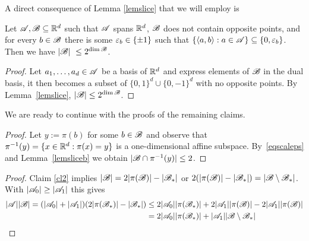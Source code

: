 \noindent A direct consequence of Lemma \ref{lemslice} that we will employ is

\begin{lemma}
    \label{lemsliceb}
    Let ${\mathscr{A}},{\mathscr{B}} \subseteq {\mathbb{R}}^d$ such that ${\mathscr{A}}$ spans ${\mathbb{R}}^d$, ${\mathscr{B}}$ does not contain opposite points, and for every $b \in {\mathscr{B}}$ there is some ${\varepsilon}_b \in \{ \pm 1\}$ such that $\{\langle a,b\rangle : a \in {\mathscr{A}}\} \subseteq \{0,{\varepsilon}_b\}$.
    Then we have $|\bb| \le 2^{\dim \bb}$.
\end{lemma}
\begin{proof}
    Let $a_1,\dots,a_d \in {\mathscr{A}}$ be a basis of ${\mathbb{R}}^d$ and express elements of ${\mathscr{B}}$ in the dual basis, it then becomes a subset of $\{0,1\}^d \cup \{0,-1\}^d$ with no opposite points. By Lemma~\ref{lemslice}, $|\bb| \le 2^{\dim \bb}$.
\end{proof}

We are ready to continue with the proofs of the remaining claims.

\claimpreimagespi*
\begin{proof}
    Let $y := \pi(b)$ for some $b \in {\mathscr{B}}$ and observe that $\pi^{-1}(y) = \{x \in {\mathbb{R}}^d : \pi(x) = y\}$ is a one-dimensional affine subspace.
    By~\eqref{eqscaleps} and Lemma~\ref{lemsliceb} we obtain $|{\mathscr{B}} \cap \pi^{-1}(y)| \le 2$.
\end{proof}

\ineqbasic*
\begin{proof}
    Claim \ref{cl2} implies $|{\mathscr{B}}| = 2|\pi({\mathscr{B}})| - |{\mathscr{B}}_*|$ or $2(|\pi({\mathscr{B}})| - |{\mathscr{B}}_*|) = |{\mathscr{B}} \setminus {\mathscr{B}}_*|$. With $|{\mathscr{A}}_0|\geq|{\mathscr{A}}_1|$ this gives
    \begin{align*}
        |{\mathscr{A}}||{\mathscr{B}}| = (|{\mathscr{A}}_0| + |{\mathscr{A}}_1|)(2|\pi({\mathscr{B}}_*)| - |{\mathscr{B}}_*|) &\leq 2|{\mathscr{A}}_0||\pi({\mathscr{B}}_*)| + 2|{\mathscr{A}}_1||\pi({\mathscr{B}})|-2|{\mathscr{A}}_1||\pi({\mathscr{B}})| \\
        &= 2|{\mathscr{A}}_0||\pi({\mathscr{B}}_*)| + |{\mathscr{A}}_1||{\mathscr{B}} \setminus {\mathscr{B}}_*|
    \end{align*}   
\end{proof}

